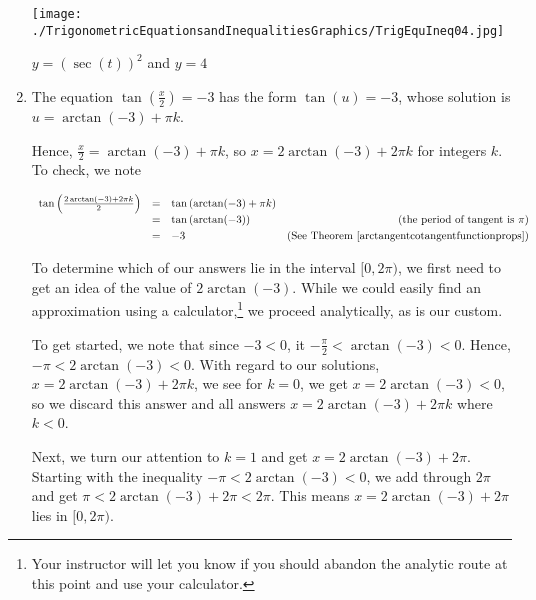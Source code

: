 \documentclass{ximera}
\begin{document}
\begin{example}
\begin{enumerate}
\begin{center}
 \texttt{[image: ./TrigonometricEquationsandInequalitiesGraphics/TrigEquIneq04.jpg]} 

  {\boldmath $y = (\sec(t))^2$} and  $y = 4$  



\end{center}

\item  The equation  $\tan\left(\frac{x}{2}\right) = -3$ has the form $\tan(u) = -3$, whose solution is $u = \arctan(-3) + \pi k$.  

\smallskip

Hence, $\frac{x}{2} = \arctan(-3) + \pi k$, so  $x = 2\arctan(-3) + 2\pi k$ for integers $k$.  To check, we note

\[ \begin{array}{rclr}

\tan\left(\frac{2\arctan(-3) + 2\pi k}{2}\right)  &  = & \tan\left( \arctan(-3) + \pi k \right)  & \\ [3pt]
																												& =  & \tan\left(\arctan(-3) \right) & \text{(the period of tangent is $\pi$)} \\ [3pt]
																												& =  & -3 & (\text{See Theorem } \ref{arctangentcotangentfunctionprops}) \\
																								
\end{array}\] 


 To determine which of our answers lie in the interval $[0,2\pi)$, we first need to get an idea of the value of $2\arctan(-3)$.  While we could easily find an approximation using a calculator,\footnote{Your instructor will let you know if you should abandon the analytic route at this point and use your calculator.} we proceed analytically, as is our custom.
 
 \smallskip
 
To get started, we note that since $-3 < 0$, it  $-\frac{\pi}{2} < \arctan(-3) < 0$.  Hence,  $-\pi < 2\arctan(-3) < 0$.   With regard to our solutions,  $x = 2\arctan(-3) + 2\pi k$, we see for $k = 0$, we get $x = 2\arctan(-3) < 0$, so we discard this answer and all answers $x = 2\arctan(-3) + 2\pi k$ where $k < 0$.  

\smallskip

Next, we turn our attention to $k = 1$ and get $x = 2\arctan(-3) + 2\pi$. Starting with the inequality $-\pi < 2\arctan(-3) < 0$, we add through $2\pi$  and get $\pi < 2\arctan(-3) +2\pi < 2\pi$.  This means $x = 2\arctan(-3) + 2\pi$ lies in $[0,2\pi)$.  


\end{enumerate}
\end{example}
\end{document}
